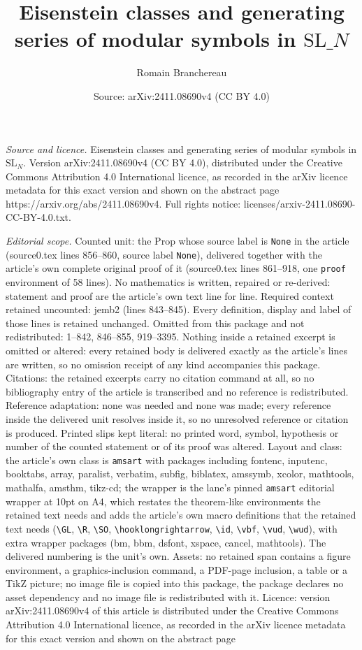 \documentclass[10pt,a4paper]{amsart}
\title[Eisenstein classes and generating series of modular symbols ]{Eisenstein classes and generating series of modular symbols in $\mathrm{SL}\_N$}
\author{Romain Branchereau}
\date{Source: arXiv:2411.08690v4 (CC BY 4.0)}
\begin{document}
\maketitle

\noindent\emph{Source and licence.} Eisenstein classes and generating series of modular symbols in $\mathrm{SL}_N$. Version arXiv:2411.08690v4 (CC BY 4.0), distributed under the Creative Commons Attribution 4.0 International licence, as recorded in the arXiv licence metadata for this exact version and shown on the abstract page https://arxiv.org/abs/2411.08690v4. Full rights notice: licenses/arxiv-2411.08690-CC-BY-4.0.txt.\par\smallskip

\noindent\textit{Editorial scope.} Counted unit: the Prop whose source label is \texttt{None} in the article (source0.tex lines 856--860, source label \texttt{None}), delivered together with the article's own complete original proof of it (source0.tex lines 861--918, one \texttt{proof} environment of 58 lines). No mathematics is written, repaired or re-derived: statement and proof are the article's own text line for line. Required context retained uncounted: jemb2 (lines 843--845). Every definition, display and label of those lines is retained unchanged. Omitted from this package and not redistributed: 1--842, 846--855, 919--3395. Nothing inside a retained excerpt is omitted or altered: every retained body is delivered exactly as the article's lines are written, so no omission receipt of any kind accompanies this package. Citations: the retained excerpts carry no citation command at all, so no bibliography entry of the article is transcribed and no reference is redistributed. Reference adaptation: none was needed and none was made; every reference inside the delivered unit resolves inside it, so no unresolved reference or citation is produced. Printed slips kept literal: no printed word, symbol, hypothesis or number of the counted statement or of its proof was altered. Layout and class: the article's own class is \texttt{amsart} with packages including fontenc, inputenc, booktabs, array, paralist, verbatim, subfig, biblatex, amssymb, xcolor, mathtools, mathalfa, amsthm, tikz-cd; the wrapper is the lane's pinned \texttt{amsart} editorial wrapper at 10pt on A4, which restates the theorem-like environments the retained text needs and adds the article's own macro definitions that the retained text needs (\texttt{\textbackslash GL}, \texttt{\textbackslash R}, \texttt{\textbackslash SO}, \texttt{\textbackslash hooklongrightarrow}, \texttt{\textbackslash id}, \texttt{\textbackslash vbf}, \texttt{\textbackslash vud}, \texttt{\textbackslash wud}), with extra wrapper packages (bm, bbm, dsfont, xspace, cancel, mathtools). The delivered numbering is the unit's own. Assets: no retained span contains a figure environment, a graphics-inclusion command, a PDF-page inclusion, a table or a TikZ picture; no image file is copied into this package, the package declares no asset dependency and no image file is redistributed with it. Licence: version arXiv:2411.08690v4 of this article is distributed under the Creative Commons Attribution 4.0 International licence, as recorded in the arXiv licence metadata for this exact version and shown on the abstract page 
\end{document}

